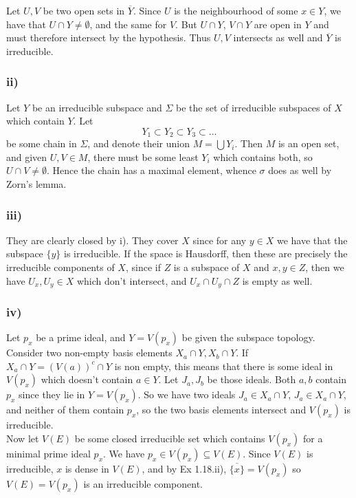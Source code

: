 \documentclass{article}
\theoremstyle{definition}
\begin{document}
Let $U, V$ be two open sets in $\overline{Y}$. Since $U$ is the neighbourhood
of some $x \in Y$, we have that $U \cap Y \not = \emptyset$, and the same for
$V$. But $U \cap Y$, $V \cap Y$ are open in $Y$ and must therefore intersect by
the hypothesis. Thus $U, V$ intersects as well and $\overline{Y}$ is
irreducible.

\subsubsection*{ii)}
Let $Y$ be an irreducible subspace and $\Sigma$ be the set of irreducible subspaces of $X$ which contain $Y$. Let
$$
	Y_1 \subset Y_2 \subset Y_3 \subset \ldots
$$
be some chain in $\Sigma$, and denote their union $M = \bigcup Y_i$. Then $M$ is an open set, and given $U, V \in M$, there must be some least $Y_i$ which contains both, so $U \cap V \not = \emptyset$. Hence the chain has a maximal element, whence $\sigma$ does as well by Zorn's lemma.

\subsubsection*{iii)}
They are clearly closed by i). They cover $X$ since for any $y \in X$ we have that the subspace $\{y\}$ is irreducible. If the space is Hausdorff, then these are precisely the irreducible components of $X$, since if $Z$ is a subspace of $X$ and $x, y \in Z$, then we have $U_x, U_y \in X$ which don't intersect, and $U_x \cap U_y \cap Z$ is empty as well.

\subsubsection*{iv)}
Let $p_x$ be a prime ideal, and $Y = V(p_x)$ be given the subspace topology. Consider two non-empty basis elements $X_a \cap Y, X_b \cap Y$. If $X_a \cap Y = (V(a))^c \cap Y$ is non empty, this means that there is some ideal in $V(p_x)$ which doesn't contain $a \in Y$. Let $J_a, J_b$ be those ideals. Both $a, b$ contain $p_x$ since they lie in $Y = V(p_x)$. So we have two ideals $J_a \in X_a \cap Y$, $J_a \in X_a \cap Y$, and neither of them contain $p_x$, so the two basis elements intersect and $V(p_x)$ is irreducible. \\

Now let $V(E)$ be some closed irreducible set which contains $V(p_x)$ for a
minimal prime ideal $p_x$. We have $p_x \in V(p_x) \subseteq V(E)$. Since
$V(E)$ is irreducible, $x$ is dense in $V(E)$, and by Ex 1.18.ii),
$\overline{\{x\}} = V(p_x)$ so $V(E) = V(p_x)$ is an irreducible component.
\end{document}
